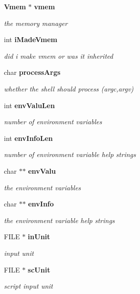 \begin{DoxyCompactItemize}
\item 
{\bf Vmem} $\ast$ {\bf vmem}
\begin{DoxyCompactList}\small\item\em the memory manager \end{DoxyCompactList}\item 
int {\bf i\+Made\+Vmem}
\begin{DoxyCompactList}\small\item\em did i make vmem or was it inherited \end{DoxyCompactList}\item 
char {\bf process\+Args}
\begin{DoxyCompactList}\small\item\em whether the shell should process (argc,argv) \end{DoxyCompactList}\item 
int {\bf env\+Valu\+Len}
\begin{DoxyCompactList}\small\item\em number of environment variables \end{DoxyCompactList}\item 
int {\bf env\+Info\+Len}
\begin{DoxyCompactList}\small\item\em number of environment variable help strings \end{DoxyCompactList}\item 
char $\ast$$\ast$ {\bf env\+Valu}
\begin{DoxyCompactList}\small\item\em the environment variables \end{DoxyCompactList}\item 
char $\ast$$\ast$ {\bf env\+Info}
\begin{DoxyCompactList}\small\item\em the environment variable help strings \end{DoxyCompactList}\item 
F\+I\+L\+E $\ast$ {\bf in\+Unit}
\begin{DoxyCompactList}\small\item\em input unit \end{DoxyCompactList}\item 
F\+I\+L\+E $\ast$ {\bf sc\+Unit}
\begin{DoxyCompactList}\small\item\em script input unit \end{DoxyCompactList}\item 

\end{DoxyCompactItemize}
